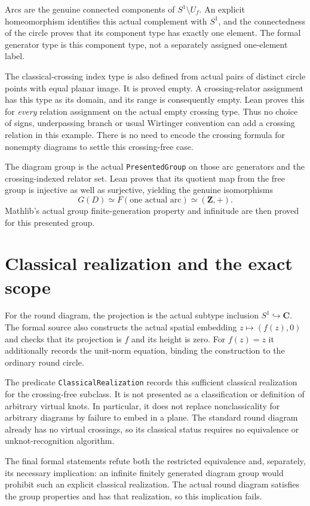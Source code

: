 \documentclass[11pt]{article}
\begin{document}
Arcs are the genuine connected components of $S^1\setminus U_f$.
An explicit homeomorphism identifies this actual complement with
$S^1$, and the connectedness of the circle proves that its component
type has exactly one element. The formal generator type is this
component type, not a separately assigned one-element label.

\newpage
The classical-crossing index type is also defined from actual
pairs of distinct circle points with equal planar image. It is
proved empty. A crossing-relator assignment has this type as its
domain, and its range is consequently empty. Lean proves this for
\emph{every} relation assignment on the actual empty crossing type.
Thus no choice of signs, underpassing branch or usual Wirtinger
convention can add a crossing relation in this example. There is
no need to encode the crossing formula for nonempty diagrams to
settle this crossing-free case.

The diagram group is the actual \texttt{PresentedGroup} on those
arc generators and the crossing-indexed relator set. Lean proves
that its quotient map from the free group is injective as well as
surjective, yielding the genuine isomorphisms
\[
 G(D)\simeq F(\text{one actual arc})\simeq (\mathbf Z,+).
\]
Mathlib's actual group finite-generation property and infinitude
are then proved for this presented group.

\section{Classical realization and the exact scope}
For the round diagram, the projection is the actual subtype inclusion
$S^1\hookrightarrow\mathbf C$. The formal source also constructs
the actual spatial embedding $z\mapsto(f(z),0)$ and checks that its
projection is $f$ and its height is zero. For $f(z)=z$ it additionally
records the unit-norm equation, binding the construction to the
ordinary round circle.

The predicate \texttt{ClassicalRealization} records this sufficient
classical realization for the crossing-free subclass. It is not
presented as a classification or definition of arbitrary virtual
knots. In particular, it does not replace nonclassicality for
arbitrary diagrams by failure to embed in a plane. The standard
round diagram already has no virtual crossings, so its classical
status requires no equivalence or unknot-recognition algorithm.

The final formal statements refute both the restricted equivalence
and, separately, its necessary implication: an infinite finitely
generated diagram group would prohibit such an explicit classical
realization. The actual round diagram satisfies the group properties
and has that realization, so this implication fails.
\end{document}
